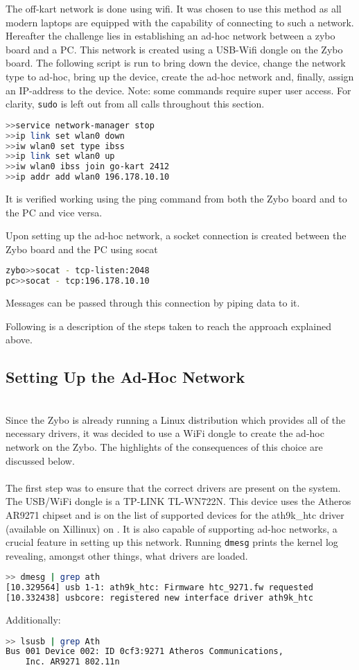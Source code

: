 The off-kart network is done using wifi.
It was chosen to use this method as all modern laptops are equipped with the capability of connecting to such a network.
Hereafter the challenge lies in establishing an ad-hoc network between a zybo board and a PC.
This network is created using a USB-Wifi dongle on the Zybo board. 
The following script is run to bring down the device, change the network type to ad-hoc, bring up the device, create the ad-hoc network and, finally, assign an IP-address to the device.
Note: some commands require super user access.
For clarity, \texttt{sudo} is left out from all calls throughout this section.
\begin{lstlisting}[language=bash]
>>service network-manager stop
>>ip link set wlan0 down
>>iw wlan0 set type ibss
>>ip link set wlan0 up
>>iw wlan0 ibss join go-kart 2412
>>ip addr add wlan0 196.178.10.10
\end{lstlisting}
It is verified working using the ping command from both the Zybo board and to the PC and vice versa.

Upon setting up the ad-hoc network, a socket connection is created between the Zybo board and the PC using socat
\begin{lstlisting}[language=bash]
zybo>>socat - tcp-listen:2048
pc>>socat - tcp:196.178.10.10
\end{lstlisting}

Messages can be passed through this connection by piping data to it.

Following is a description of the steps taken to reach the approach explained above.
\subsection{Setting Up the Ad-Hoc Network}~\\
Since the Zybo is already running a Linux distribution which provides all of the necessary drivers, it was decided to use a WiFi dongle to create the ad-hoc network on the Zybo.
The highlights of the consequences of this choice are discussed below.
\\~\\
The first step was to ensure that the correct drivers are present on the system.
The USB/WiFi dongle is a TP-LINK TL-WN722N.
This device uses the Atheros AR9271 chipset and is on the list of supported devices for the ath9k\_htc driver (available on Xillinux) on \cite{ath9k}.
It is also capable of supporting ad-hoc networks, a crucial feature in setting up this network.
Running \texttt{dmesg} prints the kernel log revealing, amongst other things, what drivers are loaded.
\begin{lstlisting}[language=bash]
>> dmesg | grep ath
[10.329564] usb 1-1: ath9k_htc: Firmware htc_9271.fw requested
[10.332438] usbcore: registered new interface driver ath9k_htc
\end{lstlisting}
Additionally:
\begin{lstlisting}[language=bash]
>> lsusb | grep Ath
Bus 001 Device 002: ID 0cf3:9271 Atheros Communications, 
	Inc. AR9271 802.11n
\end{lstlisting}

